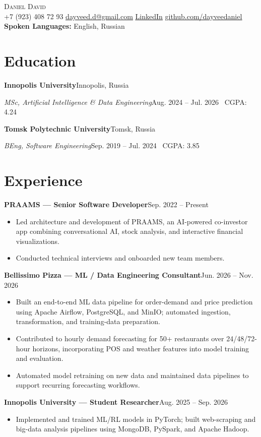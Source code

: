 \documentclass[11pt]{article}
\newcommand{\entry}[2]{\textbf{#1}\hfill #2\par}
\begin{document}
\begin{center}
    {\Huge\scshape Daniel David}\\[3pt]
    \small +7 (923) 408 72 93 \enspace\textbar\enspace
    \href{mailto:dayveed.d@gmail.com}{\underline{dayveed.d@gmail.com}} \enspace\textbar\enspace
    \href{https://www.linkedin.com/in/dayveedaniel}{\underline{LinkedIn}} \enspace\textbar\enspace
    \href{https://github.com/dayveedaniel}{\underline{github.com/dayveedaniel}}\\[3pt]
    \textbf{Spoken Languages:} English, Russian
\end{center}
\vspace{-5pt}

\section{Education}
\entry{Innopolis University}{Innopolis, Russia}
\textit{MSc, Artificial Intelligence \& Data Engineering}\hfill Aug. 2024 -- Jul. 2026 \textbar\ CGPA: 4.24\par
\vspace{6pt}
\entry{Tomsk Polytechnic University}{Tomsk, Russia}
\textit{BEng, Software Engineering}\hfill Sep. 2019 -- Jul. 2024 \textbar\ CGPA: 3.85\par

\section{Experience}
\entry{PRAAMS --- Senior Software Developer}{Sep. 2022 -- Present}
\begin{itemize}
    \item Led architecture and development of PRAAMS, an AI-powered co-investor app combining conversational AI, stock analysis, and interactive financial visualizations.
    \item Conducted technical interviews and onboarded new team members.
\end{itemize}
\vspace{6pt}
\entry{Bellissimo Pizza --- ML / Data Engineering Consultant}{Jun. 2026 -- Nov. 2026}
\begin{itemize}
    \item Built an end-to-end ML data pipeline for order-demand and price prediction using Apache Airflow, PostgreSQL, and MinIO; automated ingestion, transformation, and training-data preparation.
    \item Contributed to hourly demand forecasting for 50+ restaurants over 24/48/72-hour horizons, incorporating POS and weather features into model training and evaluation.
    \item Automated model retraining on new data and maintained data pipelines to support recurring forecasting workflows.
\end{itemize}
\vspace{6pt}
\entry{Innopolis University --- Student Researcher}{Aug. 2025 -- Sep. 2026}
\begin{itemize}
    \item Implemented and trained ML/RL models in PyTorch; built web-scraping and big-data analysis pipelines using MongoDB, PySpark, and Apache Hadoop.
\end{itemize}
\end{document}
